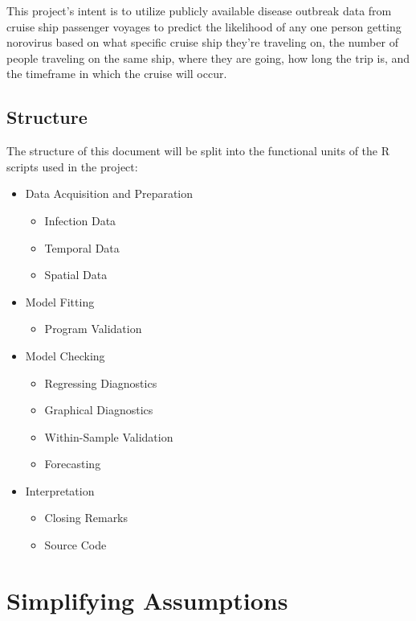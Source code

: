 \documentclass[
  11,
]{book}
\providecommand{\tightlist}{%
  \setlength{\itemsep}{0pt}\setlength{\parskip}{0pt}}
\begin{document}
This project's intent is to utilize publicly available disease outbreak data from cruise ship passenger voyages to predict the likelihood of any one person getting norovirus based on what specific cruise ship they're traveling on, the number of people traveling on the same ship, where they are going, how long the trip is, and the timeframe in which the cruise will occur.

\hypertarget{structure}{%
\subsection*{Structure}\label{structure}}


The structure of this document will be split into the functional units of the R scripts used in the project:

\begin{itemize}
\item
  Data Acquisition and Preparation

  \begin{itemize}
  \item
    Infection Data
  \item
    Temporal Data
  \item
    Spatial Data
  \end{itemize}
\item
  Model Fitting

  \begin{itemize}
  \tightlist
  \item
    Program Validation
  \end{itemize}
\item
  Model Checking

  \begin{itemize}
  \item
    Regressing Diagnostics
  \item
    Graphical Diagnostics
  \item
    Within-Sample Validation
  \item
    Forecasting
  \end{itemize}
\item
  Interpretation

  \begin{itemize}
  \item
    Closing Remarks
  \item
    Source Code
  \end{itemize}
\end{itemize}

\hypertarget{simplifying-assumptions}{%
\section*{Simplifying Assumptions}\label{simplifying-assumptions}}
\end{document}
